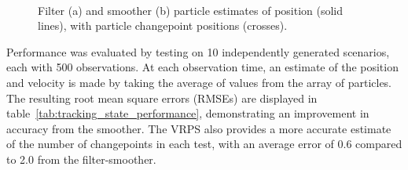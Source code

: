 \documentclass[10pt,twocolumn,twoside]{IEEEtran}
\begin{document}
\begin{figure}[!t]
\centering
{} \\
\caption{Filter (a) and smoother (b) particle estimates of position (solid lines), with particle changepoint positions (crosses). }
\label{fig:2D_particle_results}
\end{figure}

Performance was evaluated by testing on 10 independently generated scenarios, each with 500 observations. At each observation time, an estimate of the position and velocity is made by taking the average of values from the array of particles. The resulting root mean square errors (RMSEs) are displayed in table~\ref{tab:tracking_state_performance}, demonstrating an improvement in accuracy from the smoother. The VRPS also provides a more accurate estimate of the number of changepoints in each test, with an average error of 0.6 compared to 2.0 from the filter-smoother.
\end{document}
